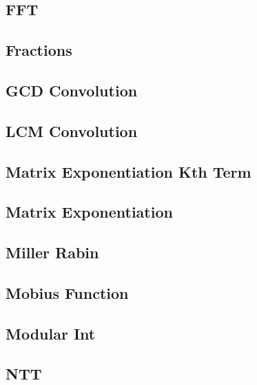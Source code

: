 \subsection{FFT}
\raggedbottom
\hrulefill
\subsection{Fractions}
\raggedbottom
\hrulefill
\subsection{GCD Convolution}
\raggedbottom
\hrulefill
\subsection{LCM Convolution}
\raggedbottom
\hrulefill
\subsection{Matrix Exponentiation Kth Term}
\raggedbottom
\hrulefill
\subsection{Matrix Exponentiation}
\raggedbottom
\hrulefill
\subsection{Miller Rabin}
\raggedbottom
\hrulefill
\subsection{Mobius Function}
\raggedbottom
\hrulefill
\subsection{Modular Int}
\raggedbottom
\hrulefill
\subsection{NTT}
\raggedbottom
\hrulefill
